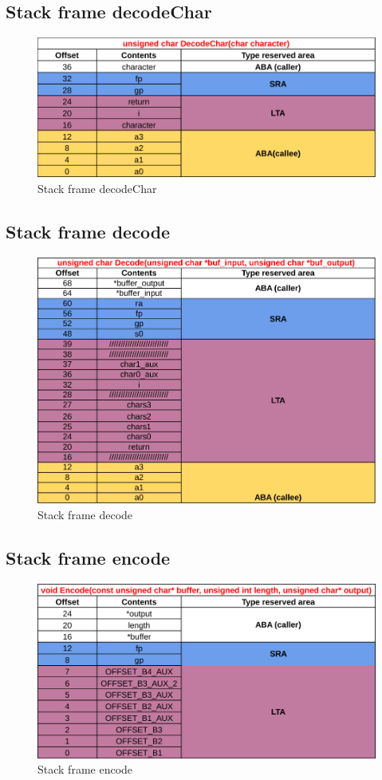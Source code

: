 \documentclass[11pt,a4paper]{article}
\begin{document}
\subsection{Stack frame decodeChar}
\begin{figure}[H]
  \centering
    \includegraphics[width=14cm]{decodeCharStackFrame}
    \caption{Stack frame decodeChar}
  \label{fig:decodeCharStackFrame}
\end{figure}

\subsection{Stack frame decode}
\begin{figure}[H]
  \centering
    \includegraphics[width=14cm]{decodeStackFrame}
    \caption{Stack frame decode}
  \label{fig:decodeStackFrame}
\end{figure}

\subsection{Stack frame encode}
\begin{figure}[H]
  \centering
    \includegraphics[width=14cm]{encodeStackFrame}
    \caption{Stack frame encode}
  \label{fig:encodeStackFrame}
\end{figure}
\end{document}
